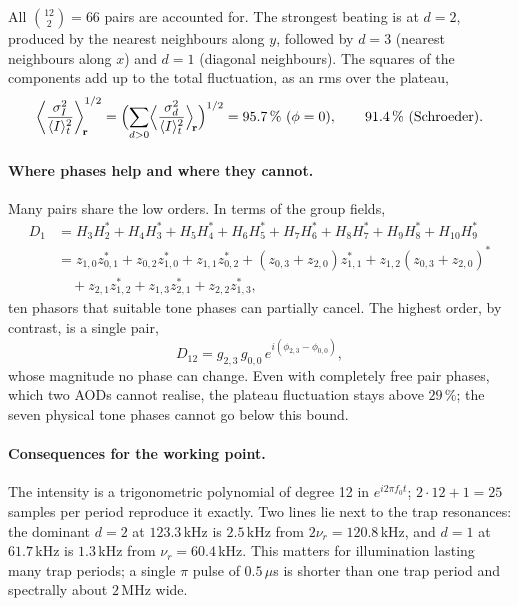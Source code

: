 All $\binom{12}{2}=66$ pairs are accounted for. The strongest beating is at
$d=2$, produced by the nearest neighbours along $y$, followed by $d=3$ (nearest
neighbours along $x$) and $d=1$ (diagonal neighbours). The squares of the
components add up to the total fluctuation, as an rms over the plateau,
\begin{equation}
\left\langle\frac{\sigma_I^2}{\langle I\rangle_t^2}\right\rangle_{\!\mathbf r}^{1/2}
=\Bigl(\sum_{d>0}\Bigl\langle\frac{\sigma_d^2}{\langle I\rangle_t^2}\Bigr\rangle_{\!\mathbf r}\Bigr)^{1/2}
=95.7\,\%\ (\phi=0),\qquad 91.4\,\%\ (\text{Schroeder}).
\end{equation}

\paragraph{Where phases help and where they cannot.}
Many pairs share the low orders. In terms of the group fields,
\begin{equation}
\begin{split}
D_1&=H_3H_2^*+H_4H_3^*+H_5H_4^*+H_6H_5^*+H_7H_6^*+H_8H_7^*+H_9H_8^*+H_{10}H_9^*\\
&=z_{1,0}z_{0,1}^*+z_{0,2}z_{1,0}^*+z_{1,1}z_{0,2}^*
+\left(z_{0,3}+z_{2,0}\right)z_{1,1}^*
+z_{1,2}\left(z_{0,3}+z_{2,0}\right)^*\\
&\quad+z_{2,1}z_{1,2}^*+z_{1,3}z_{2,1}^*+z_{2,2}z_{1,3}^*,
\end{split}
\end{equation}
ten phasors that suitable tone phases can partially cancel. The highest order,
by contrast, is a single pair,
\begin{equation}
D_{12}=g_{2,3}\,g_{0,0}\,e^{i(\phi_{2,3}-\phi_{0,0})},
\end{equation}
whose magnitude no phase can change. Even with completely free pair phases,
which two AODs cannot realise, the plateau fluctuation stays above $29\,\%$;
the seven physical tone phases cannot go below this bound.

\paragraph{Consequences for the working point.}
The intensity is a trigonometric polynomial of degree 12 in $e^{i2\pi f_0t}$;
$2\cdot12+1=25$ samples per period reproduce it exactly. Two lines lie next
to the trap resonances: the dominant $d=2$ at $123.3$\,kHz is $2.5$\,kHz from
$2\nu_r=120.8$\,kHz, and $d=1$ at $61.7$\,kHz is $1.3$\,kHz from
$\nu_r=60.4$\,kHz. This matters for illumination lasting many trap periods;
a single $\pi$ pulse of $0.5\,\mu$s is shorter than one trap period and
spectrally about $2$\,MHz wide.
